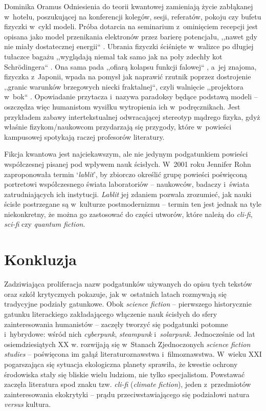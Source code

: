 \begin{artplenv}{Dominika Oramus}
Odniesienia do teorii kwantowej zamieniają życie zabłąkanej w~hotelu, poszukującej na konferencji kolegów, sesji, referatów, pokoju czy bufetu fizyczki w~cykl modeli. Próba dotarcia na seminarium z~ominięciem recepcji jest opisana jako model przenikania elektronów przez barierę potencjału, ,,nawet gdy nie miały dostatecznej energii``
\parencite[][s.~11]{willis_niebieski_2010}. %
 Ubrania fizyczki ściśnięte w~walizce po długiej tułaczce bagażu ,,wyglądają niemal tak samo jak na poły zdechły kot Schrödingera`` 
\parencite[][s.~12]{willis_niebieski_2010}. %
 Ona sama pada ,,ofiarą kolapsu funkcji falowej`` 
\parencite[][s.~15]{willis_niebieski_2010}, %
 a~jej znajoma, fizyczka z~Japonii, wpada na pomysł jak naprawić rzutnik poprzez dostrojenie ,,granic warunków brzegowych niecki fraktalnej``, czyli walnięcie ,,projektora w~bok`` 
\parencite[][s.~21]{willis_niebieski_2010}. %
 Opowiadanie przytacza i~nazywa paradoksy będące podstawą modeli -- oszczędza więc humanistom wysiłku wytropienia ich w~podręcznikach. Jest przykładem zabawy intertekstualnej odwracającej stereotyp mądrego fizyka, gdyż właśnie fizykom/naukowcom przydarzają się przygody, które w~powieści kampusowej spotykają raczej profesorów literatury.

Fikcja kwantowa jest najciekawszym, ale nie jedynym podgatunkiem powieści współczesnej pisanej pod wpływem nauk ścisłych. W~2001 roku Jennifer Rohn zaproponowała termin ‘\textit{lablit}’, by zbiorczo określić grupę powieści poświęconą portretowi współczesnego świata laboratoriów -- naukowców, badaczy i~świata zatrudniających ich instytucji. \textit{Lablit} jej zdaniem pozwala zrozumieć, jak nauki ścisłe postrzegane są w~kulturze postmodernizmu -- termin ten jest jednak na tyle niekonkretny, że można go zastosować do części utworów, które należą do \textit{cli-fi}, \textit{sci-fi} czy \textit{quantum fiction}.

\section*{Konkluzja}
Zadziwiająca proliferacja nazw podgatunków używanych do opisu tych tekstów oraz szkół krytycznych pokazuje, jak w~ostatnich latach rozmywają się tradycyjne podziały gatunkowe. Obok \textit{science fiction} -- pierwszego historycznie gatunku literackiego zakładającego włączenie nauk ścisłych do sfery zainteresowania humanistów -- zaczęły tworzyć się podgatunki potomne i~hybrydowe: wśród nich \textit{cyberpunk}, \textit{steampunk} i~\textit{solarpunk}. Jednocześnie od lat osiemdziesiątych XX w. rozwijają się w~Stanach Zjednoczonych \textit{science} \textit{fiction studies} -- poświęcona im gałąź literaturoznawstwa i~filmoznawstwa. W~wieku XXI pogarszająca się sytuacja ekologiczna planety sprawiła, że kwestie ochrony środowiska stały się bliskie wielu ludziom, nie tylko specjalistom. Powstawać zaczęła literatura spod znaku tzw. \textit{cli-fi} (\textit{climate fiction}), jeden z~przedmiotów zainteresowania ekokrytyki -- prądu przeciwstawiającego się podziałowi natura \textit{versus} kultura.


\end{artplenv}
